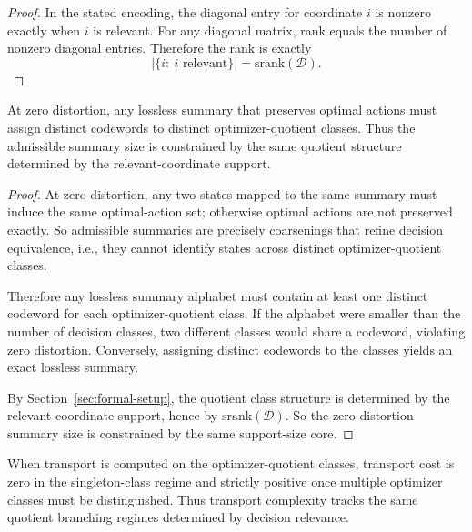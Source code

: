 \begin{proof}
In the stated encoding, the diagonal entry for coordinate $i$ is nonzero exactly when $i$ is relevant. For any diagonal matrix, rank equals the number of nonzero diagonal entries. Therefore the rank is exactly
\[
\big|\{i:\ i \text{ relevant}\}\big|=\mathrm{srank}(\mathcal{D}).
\]
\end{proof}

\begin{theorem}\label{thm:rate-distortion-bridge}
At zero distortion, any lossless summary that preserves optimal actions must assign distinct codewords to distinct optimizer-quotient classes. Thus the admissible summary size is constrained by the same quotient structure determined by the relevant-coordinate support.
\end{theorem}

\begin{proof}
At zero distortion, any two states mapped to the same summary must induce the same optimal-action set; otherwise optimal actions are not preserved exactly. So admissible summaries are precisely coarsenings that refine decision equivalence, i.e., they cannot identify states across distinct optimizer-quotient classes.

Therefore any lossless summary alphabet must contain at least one distinct codeword for each optimizer-quotient class. If the alphabet were smaller than the number of decision classes, two different classes would share a codeword, violating zero distortion. Conversely, assigning distinct codewords to the classes yields an exact lossless summary.

By Section~\ref{sec:formal-setup}, the quotient class structure is determined by the relevant-coordinate support, hence by $\mathrm{srank}(\mathcal{D})$. So the zero-distortion summary size is constrained by the same support-size core.
\end{proof}

\begin{theorem}\label{thm:wasserstein-bridge}
When transport is computed on the optimizer-quotient classes, transport cost is zero in the singleton-class regime and strictly positive once multiple optimizer classes must be distinguished. Thus transport complexity tracks the same quotient branching regimes determined by decision relevance.
\end{theorem}

